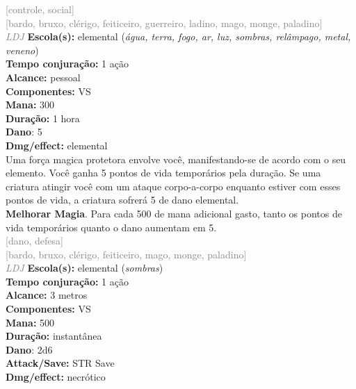 \documentclass{RPG_Adventure}[2021/10/20]
\begin{document}
{\scriptsize \textcolor{gray}{[controle, social]\\}}
{\scriptsize \textcolor{gray}{[bardo, bruxo, clérigo, feiticeiro, guerreiro, ladino, mago, monge, paladino]\\}}
{\tiny \textcolor{gray}{\textit{LDJ}}}
{\small \t \textbf{Escola(s):} elemental (\textit{água, terra, fogo, ar, luz, sombras, relâmpago, metal, veneno})\\\t \textbf{Tempo conjuração:} 1 ação\\\t \textbf{Alcance:} pessoal\\\t \textbf{Componentes:} VS\\\t \textbf{Mana:} 300\\\t \textbf{Duração:} 1 hora\\\t \textbf{Dano}: 5\\\t \textbf{Dmg/effect:} elemental\\}
{\normalsize Uma força magica protetora envolve você, manifestando-se de acordo com o seu elemento. Você ganha 5 pontos de vida temporários pela duração. Se uma criatura atingir você com um ataque corpo-a-corpo enquanto estiver com esses pontos de vida, a criatura sofrerá 5 de dano elemental.\\\t \textbf{Melhorar Magia}. Para cada 500 de mana adicional gasto, tanto os pontos de vida temporários quanto o dano aumentam em 5.\\}
{\scriptsize \textcolor{gray}{[dano, defesa]\\}}
{\scriptsize \textcolor{gray}{[bardo, bruxo, clérigo, feiticeiro, mago, monge, paladino]\\}}
{\tiny \textcolor{gray}{\textit{LDJ}}}
{\small \t \textbf{Escola(s):} elemental (\textit{sombras})\\\t \textbf{Tempo conjuração:} 1 ação\\\t \textbf{Alcance:} 3 metros\\\t \textbf{Componentes:} VS\\\t \textbf{Mana:} 500\\\t \textbf{Duração:} instantânea\\\t \textbf{Dano}: 2d6\\\t \textbf{Attack/Save:} STR Save\\\t \textbf{Dmg/effect:} necrótico\\}
\end{document}
